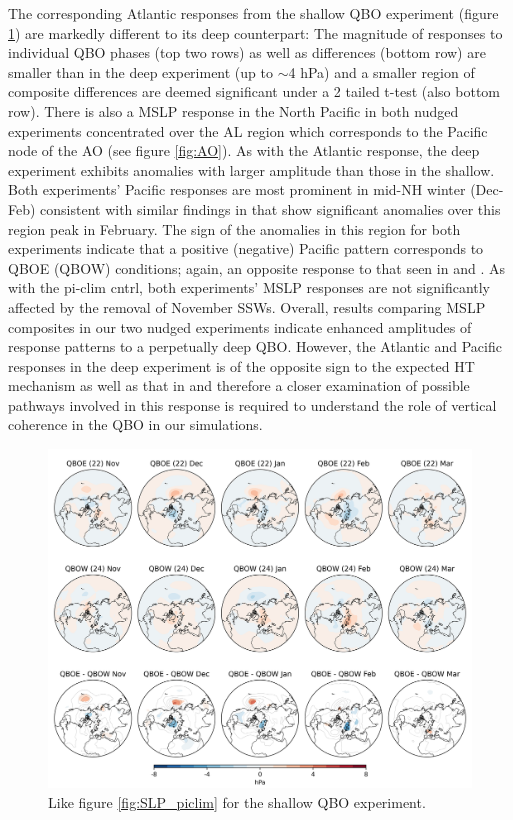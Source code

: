 The corresponding Atlantic responses from the shallow QBO experiment (figure \ref{fig:SLP_shallow}) are markedly different to its deep counterpart: The magnitude of responses to individual QBO phases (top two rows) as well as differences (bottom row) are smaller than in the deep experiment (up to $\sim$4 hPa) and a smaller region of composite differences are deemed significant under a 2 tailed t-test (also bottom row). There is also a MSLP response in the North Pacific in both nudged experiments concentrated over the AL region which corresponds to the Pacific node of the AO (see figure \ref{fig:AO}). As with the Atlantic response, the deep experiment exhibits anomalies with larger amplitude than those in the shallow. Both experiments' Pacific responses are most prominent in mid-NH winter (Dec-Feb) consistent with similar findings in \cite{graySurface2018b} that show significant anomalies over this region peak in February. The sign of the anomalies in this region for both experiments indicate that a positive (negative) Pacific pattern corresponds to QBOE (QBOW) conditions; again, an opposite response to that seen in \cite{andrewsObserved2019d} and \cite{graySurface2018b}. As with the pi-clim cntrl, both experiments' MSLP responses are not significantly affected by the removal of November SSWs. Overall, results comparing MSLP composites in our two nudged experiments indicate enhanced amplitudes of response patterns to a perpetually deep QBO. However, the Atlantic and Pacific responses in the deep experiment is of the opposite sign to the expected HT mechanism as well as that in \citep{andrewsObserved2019d} and therefore a closer examination of possible pathways involved in this response is required to understand the role of vertical coherence in the QBO in our simulations.

\begin{figure}[h!]
\begin{center}
\noindent\includegraphics[width =0.8\linewidth]{Figures/Figures-deepQBO/LAGGED_SLP_composites_individual_months_QBO_phases_U_s_50hPa_5thresh.png}
\caption[MSLP composites under QBO phases in the shallow QBO simulation]{Like figure \ref{fig:SLP_piclim} for the shallow QBO experiment.}
\label{fig:SLP_shallow}
\end{center}
\end{figure}
\newpage

